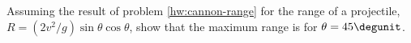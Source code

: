 Assuming the result of problem \ref{hw:cannon-range} for the
range of a projectile, $R=(2v^2/g)\sin\theta\cos\theta$, show that the maximum range is
for $\theta =45\degunit$.
